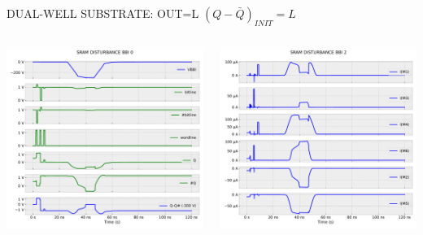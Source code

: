 
\begin{frame}{DUAL-WELL SUBSTRATE: OUT=L}
	\vspace{5mm}
	$(Q-\bar{Q})_{INIT}=L$
	\vspace{5mm}
	\begin{columns}
		\begin{column}{0.5\textwidth}
			\centering
			\includegraphics[width=\textwidth]{./figures/SRAMBBI0_zLOW_DW-300.pdf}
		\end{column}
		\begin{column}{0.5\textwidth}
			\centering
			\includegraphics[width=\textwidth]{./figures/SRAMBBI2_zLOW_DW-300.pdf}
		\end{column}
	\end{columns}
\end{frame}
